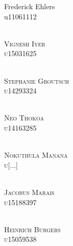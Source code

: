 \documentclass[runningheads,a4paper]{article}
\begin{document}
\begin{titlepage}
\begin{center}
\begin{multicols}{2}
{Frederick Ehlers\\ 

u11061112\\ 

}



\textsc{\large\\

Vignesh Iyer\\

u15031625\\ 

}



\textsc{\large\\

Stephanie Groutsch\\

u14293324\\ 

}



\textsc{\large\\

Neo Thokoa\\

u14163285\\

}



\columnbreak



\textsc{\large\\

Nokuthula Manana\\

u[...]\\

}



\textsc{\large\\

Jacobus Marais\\

u15188397\\

}



\textsc{\large\\

Heinrich Burgers\\

u15059538\\

}








\end{multicols}
\end{center}
\end{titlepage}
\end{document}
